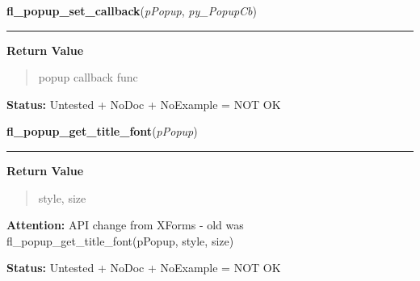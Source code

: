 \hspace{.8\funcindent}\begin{boxedminipage}{\funcwidth}

    \raggedright \textbf{fl\_popup\_set\_callback}(\textit{pPopup}, \textit{py\_PopupCb})

    \vspace{-1.5ex}

    \rule{\textwidth}{0.5\fboxrule}
\setlength{\parskip}{2ex}
\setlength{\parskip}{1ex}
      \textbf{Return Value}
    \vspace{-1ex}

      \begin{quote}
      popup callback func

      \end{quote}

\textbf{Status:} Untested + NoDoc + NoExample = NOT OK



    \end{boxedminipage}

    \label{xformslib:library:fl_popup_get_title_font}

    \vspace{0.5ex}

\hspace{.8\funcindent}\begin{boxedminipage}{\funcwidth}

    \raggedright \textbf{fl\_popup\_get\_title\_font}(\textit{pPopup})

    \vspace{-1.5ex}

    \rule{\textwidth}{0.5\fboxrule}
\setlength{\parskip}{2ex}
\setlength{\parskip}{1ex}
      \textbf{Return Value}
    \vspace{-1ex}

      \begin{quote}
      style, size

      \end{quote}

\textbf{Attention:} API change from XForms - old was fl\_popup\_get\_title\_font(pPopup, style,
size)



\textbf{Status:} Untested + NoDoc + NoExample = NOT OK



    \end{boxedminipage}

